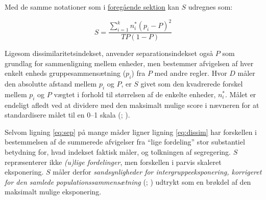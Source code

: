 \documentclass[
]{book}
\begin{document}
Med de samme notationer som i \hyperref[dissimkap]{foregående sektion} kan \(S\) udregnes som:

\begin{equation}
\label{eq:sep}
S = \frac{{\textstyle \sum_{i=1}^{k}} n_{i}^{*} \left ( p_{i}-P \right )^{2} }{ TP \left ( 1-P \right ) } 
\end{equation}

Ligesom dissimilaritetsindekset, anvender separationsindekset også \(P\) som grundlag for sammenligning mellem enheder, men bestemmer afvigelsen af hver enkelt enheds gruppesammensætning (\(p_{i}\)) fra \(P\) med andre regler. Hvor \(D\) måler den absolutte afstand mellem \(p_{i}\) og \(P\), er \(S\) givet som den kvadrerede forskel mellem \(p_{i}\) og \(P\) vægtet i forhold til størrelsen af de enkelte enheder, \(n_{i}^{*}\). Målet er endeligt afledt ved at dividere med den maksimalt mulige score i nævneren for at standardisere målet til en 0--1 skala (; ).

Selvom ligning \eqref{eq:sep} på mange måder ligner ligning \eqref{eq:dissim} har forskellen i bestemmelsen af de summerede afvigelser fra ``lige fordeling'' stor substantiel betydning for, hvad indekset faktisk måler, og tolkningen af segregering. \(S\) repræsenterer ikke \emph{(u)lige fordelinger}, men forskellen i parvis skaleret eksponering. \(S\) måler derfor \emph{sandsynligheder for intergruppeeksponering, korrigeret for den samlede populationssammensætning} (; ) udtrykt som en brøkdel af den maksimalt mulige eksponering.
\end{document}
